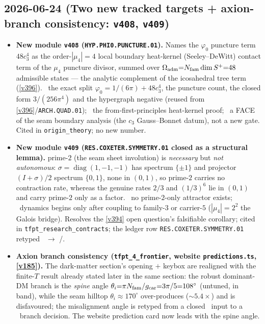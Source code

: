 \subsection*{2026-06-24 (Two new tracked targets + axion-branch consistency: \texttt{v408}, \texttt{v409})}
\begin{itemize}
\item \textbf{New module \texttt{v408} (\texttt{HYP.PHI0.PUNCTURE.01}).} Names the $\varphi_0$ puncture term
$48c_3^4$ as the order-$|\mu_4|{=}4$ local boundary heat-kernel (Seeley--DeWitt) contact term of the $\mu_4$
puncture divisor, summed over $\Omega_{\mathrm{adm}}{=}N_{\mathrm{fam}}\dim S^+{=}48$ admissible states --- the analytic
complement of the icosahedral tree term (\vref{v396}). \mE\ the exact split $\varphi_0{=}1/(6\pi){+}48c_3^4$,
the puncture count, the closed form $3/(256\pi^4)$ and the hypergraph negative (reused from
\vref{v396}/\texttt{ARCH.QUAD.01}); \mO\ the from-first-principles heat-kernel proof; \mC\ a FACE of the seam
boundary analysis (the $c_3$ Gauss--Bonnet datum), not a new gate. Cited in \texttt{origin\_theory}; no new number.
\item \textbf{New module \texttt{v409} (\texttt{RES.COXETER.SYMMETRY.01} closed as a structural lemma).} prime-$2$
(the seam sheet involution) is \emph{necessary} but \emph{not autonomous}: $\sigma{=}\operatorname{diag}(1,-1,-1)$
has spectrum $\{\pm1\}$ and projector $(I{+}\sigma)/2$ spectrum $\{0,1\}$, none in $(0,1)$, so prime-$2$ carries
no contraction rate, whereas the genuine rates $2/3$ and $(1/3)^6$ lie in $(0,1)$ and carry prime-$2$ only as a
factor. \mE\ no prime-$2$-only attractor exists; \mC\ dynamics begins only after coupling to family-$3$ or
carrier-$5$ ($|\mu_4|{=}2^2$ the Galois bridge). Resolves the \vref{v394} open question's falsifiable corollary;
cited in \texttt{tfpt\_research\_contracts}; the ledger row \texttt{RES.COXETER.SYMMETRY.01} retyped \mO\ $\to$ \mE/\mC.
\item \textbf{Axion branch consistency (\texttt{tfpt\_4\_frontier}, website \texttt{predictions.ts}, \vref{v185}).}
The dark-matter section's opening $+$ keybox are realigned with the finite-$T$ result already stated later in the
same section: the robust dominant-DM branch is the \emph{spine} angle $\theta_i{=}\pi N_{\mathrm{fam}}/g_{\mathrm{car}}{=}3\pi/5{=}108^\circ$
(untuned, in band), while the seam hilltop $\theta_i{\approx}170^\circ$ over-produces ($\sim5.4\times$) and is
disfavoured; the misalignment angle is retyped from a closed \mE\ input to a \mC\ branch decision. The website
prediction card now leads with the spine angle.

\end{itemize}
